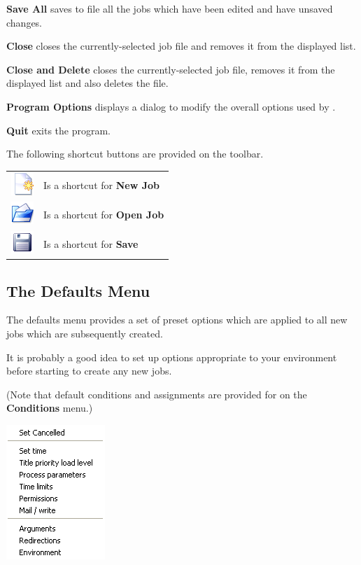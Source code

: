 \textbf{Save All} saves to file all the jobs which have been edited and have unsaved changes.

\textbf{Close} closes the currently-selected job file and removes it from the displayed list.

\textbf{Close and Delete} closes the currently-selected job file, removes it from the displayed list and also deletes the file.

\textbf{Program Options} \label{bkm:progopts}displays a dialog to modify the overall options used by .

\textbf{Quit} exits the program.

The following shortcut buttons are provided on the toolbar.

\begin{tabular}{l p{12cm}}
\includegraphics{img/btrwnewjob.png} & Is a shortcut for \textbf{New Job}\\
\includegraphics{img/btrwopenjob.png} & Is a shortcut for \textbf{Open Job}\\
\includegraphics{img/btrwsavejob.png} & Is a shortcut for \textbf{Save}\\
\end{tabular}

\subsection{The Defaults Menu}
The defaults menu provides a set of preset options which are applied to all new jobs
which are subsequently created.

It is probably a good idea to set up options appropriate to your environment before
starting to create any new jobs.

(Note that default conditions and assignments are provided for on the \textbf{Conditions} menu.)

\includegraphics{img/btrwdefsmenu.png} 

